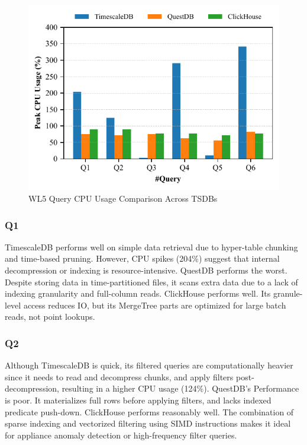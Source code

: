 \documentclass[conference]{IEEEtran}
\begin{document}
\begin{figure}[tb]
\centering
\includegraphics[width=1.0\linewidth]{3_query_cpu.pdf}
\caption{WL5 Query CPU Usage Comparison Across TSDBs}
\label{fig:query_cpu_comparison}
\end{figure}

\subsubsection{Q1}
TimescaleDB performs well on simple data retrieval due to hyper-table chunking and time-based pruning. However, CPU spikes (204\%) suggest that internal decompression or indexing is resource-intensive.
QuestDB performs the worst. Despite storing data in time-partitioned files, it scans extra data due to a lack of indexing granularity and full-column reads.
ClickHouse performs well. Its granule-level access reduces IO, but its MergeTree parts are optimized for large batch reads, not point lookups.

\subsubsection{Q2}

Although TimescaleDB is quick, its filtered queries are computationally heavier since it needs to read and decompress chunks, and apply filters post-decompression, resulting in a higher CPU usage (124\%).
QuestDB's Performance is poor. It materializes full rows before applying filters, and lacks indexed predicate push-down.
ClickHouse performs reasonably well. The combination of sparse indexing and vectorized filtering using SIMD instructions makes it ideal for appliance anomaly detection or high-frequency filter queries.
\end{document}
